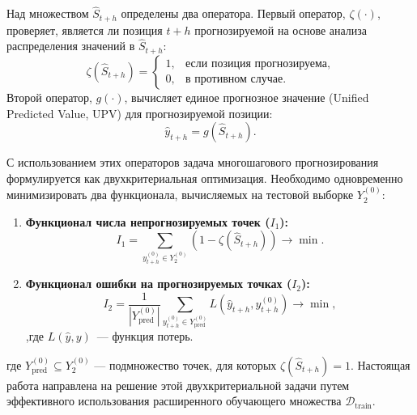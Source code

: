 Над множеством $\hat{S}_{t+h}$ определены два оператора. Первый оператор,
 $\zeta(\cdot)$, проверяет, является ли позиция $t+h$ прогнозируемой на
 основе анализа распределения значений в $\hat{S}_{t+h}$:
\begin{equation}
\zeta(\hat{S}_{t+h}) =
\begin{cases}
1, & \text{если позиция прогнозируема,} \\
0, & \text{в противном случае.}
\end{cases}
\end{equation}
Второй оператор, $g(\cdot)$, вычисляет единое прогнозное значение
(Unified Predicted Value, UPV) для прогнозируемой позиции:
\begin{equation}
\hat{y}_{t+h} = g(\hat{S}_{t+h}).
\end{equation}

С использованием этих операторов задача многошагового прогнозирования
 формулируется как двухкритериальная оптимизация. Необходимо одновременно
 минимизировать два функционала, вычисляемых на тестовой выборке $Y_2^{(0)}$:
\begin{enumerate}
    \item \textbf{Функционал числа непрогнозируемых точек ($I_1$):}
    \begin{equation}
    I_1 = \sum_{y_{t+h}^{(0)} \in Y_2^{(0)}} \left( 1 - \zeta(\hat{S}_{t+h}) \right) \to \min.
    \end{equation}

\item \textbf{Функционал ошибки на прогнозируемых точках ($I_2$):}
    \begin{equation}
    I_2 = \frac{1}{|Y_{\text{pred}}^{(0)}|} \sum_{y_{t+h}^{(0)} \in Y_{\text{pred}}^{(0)}} L(\hat{y}_{t+h}, y_{t+h}^{(0)}) \to \min,
    \end{equation},где $L(\hat{y}, y)$~--- функция потерь.
\end{enumerate}
где $Y_{\text{pred}}^{(0)} \subseteq Y_2^{(0)}$ — подмножество точек, для
 которых $\zeta(\hat{S}_{t+h}) = 1$. Настоящая работа направлена на решение
  этой двухкритериальной задачи путем эффективного использования расширенного
   обучающего множества $\mathcal{D}_{\text{train}}$.